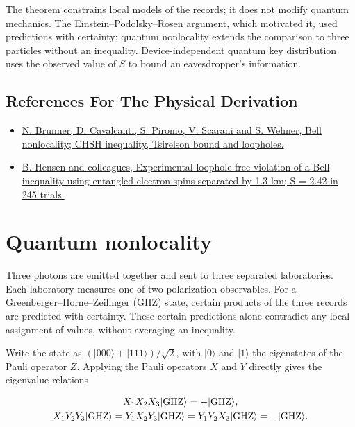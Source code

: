 \documentclass[11pt,oneside]{book}
\newenvironment{centeredalign}{\[\begin{gathered}[c]}{\end{gathered}\]}
\begin{document}
The theorem constrains local models of the records; it does not modify quantum mechanics. The Einstein--Podolsky--Rosen argument, which motivated it, used predictions with certainty; quantum nonlocality extends the comparison to three particles without an inequality. Device-independent quantum key distribution uses the observed value of \(S\) to bound an eavesdropper's information.

\subsection*{References For The Physical Derivation}
\begin{itemize}
\item \href{https://arxiv.org/abs/1303.2849}{N. Brunner, D. Cavalcanti, S. Pironio, V. Scarani and S. Wehner, Bell nonlocality; CHSH inequality, Tsirelson bound and loopholes.}
\item \href{https://arxiv.org/abs/1508.05949}{B. Hensen and colleagues, Experimental loophole-free violation of a Bell inequality using entangled electron spins separated by 1.3 km; S = 2.42 in 245 trials.}
\end{itemize}





\clearpage

\section{Quantum nonlocality}

\label{topic:quantum-nonlocality}

Three photons are emitted together and sent to three separated laboratories. Each laboratory measures one of two polarization observables. For a Greenberger--Horne--Zeilinger (GHZ) state, certain products of the three records are predicted with certainty. These certain predictions alone contradict any local assignment of values, without averaging an inequality.

Write the state as \((|000\rangle+|111\rangle)/\sqrt2\), with \(|0\rangle\) and \(|1\rangle\) the eigenstates of the Pauli operator \(Z\). Applying the Pauli operators \(X\) and \(Y\) directly gives the eigenvalue relations

\begin{centeredalign}
X_1X_2X_3|{\rm GHZ}\rangle=+|{\rm GHZ}\rangle,\\
X_1Y_2Y_3|{\rm GHZ}\rangle=Y_1X_2Y_3|{\rm GHZ}\rangle=Y_1Y_2X_3|{\rm GHZ}\rangle=-|{\rm GHZ}\rangle.
\end{centeredalign}
\end{document}
